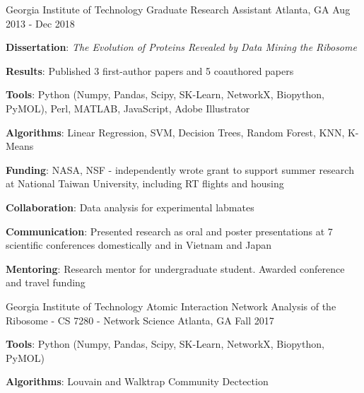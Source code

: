 

\begin{cventries}

  \cventry
    {Georgia Institute of Technology} %
    {Graduate Research Assistant} %
    {Atlanta, GA} %
    {Aug 2013 - Dec 2018} %
    {{\textbf{Dissertation}: \textit{The Evolution of Proteins Revealed by Data Mining the Ribosome}}
      \begin{cvitems} %
      \vspace{4.0mm}
        \item {\textbf{Results}: Published 3 first-author papers and 5 coauthored papers}
        \item {\textbf{Tools}: Python {\tiny(Numpy, Pandas, Scipy, SK-Learn, NetworkX, Biopython, PyMOL)}, Perl, MATLAB, JavaScript, Adobe Illustrator}
        \item {\textbf{Algorithms}: Linear Regression, SVM, Decision Trees, Random Forest, KNN, K-Means}
        \item {\textbf{Funding}: NASA, NSF - independently wrote grant to support summer research at National Taiwan University, including RT flights and housing}
        \item {\textbf{Collaboration}: Data analysis for experimental labmates}
        \item {\textbf{Communication}: Presented research as oral and poster presentations at 7 scientific conferences domestically and in Vietnam and Japan}
        \item {\textbf{Mentoring}: Research mentor for undergraduate student. Awarded conference and travel funding} 
      \end{cvitems}
    }

  \cventry
    {Georgia Institute of Technology} %
    {Atomic Interaction Network Analysis of the Ribosome - CS 7280 - Network Science} %
    {Atlanta, GA} %
    {Fall 2017} %
    {
      \begin{cvitems} %
        \item {\textbf{Tools}: Python {\tiny(Numpy, Pandas, Scipy, SK-Learn, NetworkX, Biopython, PyMOL)}}
        \item {\textbf{Algorithms}: Louvain and Walktrap Community Dectection}
      \end{cvitems}
    }


\end{cventries}
